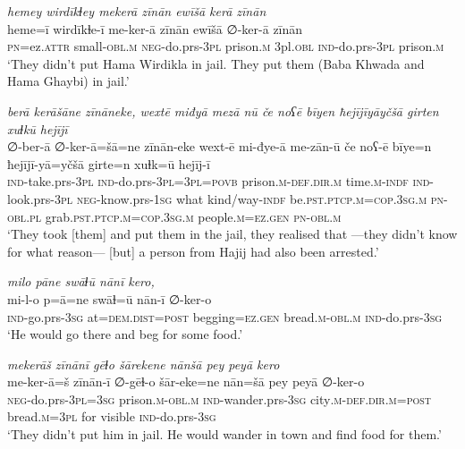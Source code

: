\ea \label{BP.138}
\textit{hemey wirdīkɫey mekerā zīnān ewīšā kerā zīnān} \\ 
\gll heme=ī wirdīkɫe-ī me-ker-ā zīnān ewīšā ∅-ker-ā zīnān \\ 
 \textsc{pn}=ez.\textsc{attr} small\textsc{-obl}\textsc{.m} \textsc{neg-}do.prs\textsc{-3pl} prison\textsc{.m} 3pl\textsc{.obl} \textsc{ind-}do.prs\textsc{-3pl} prison\textsc{.m} \\ 
\glt `They didn’t put Hama Wirdikla in jail. They put them (Baba Khwada and Hama Ghaybi) in jail.'
\z 
 
\ea \label{BP.139}
\textit{berā kerāšāne zīnāneke, wextē miđyā mezā nū če noʕē bīyen ħejījīyāyčšā girten xuɫkū hejījī} \\ 
\gll ∅-ber-ā ∅-ker-ā=šā=ne zīnān-eke wext-ē mi-đye-ā me-zān-ū če noʕ-ē bīye=n ħejījī-yā=yčšā girte=n xuɫk=ū hejīj-ī \\ 
 \textsc{ind-}take.prs\textsc{-3pl} \textsc{ind-}do.prs\textsc{-3pl}\textsc{=3pl}\textsc{=\textsc{povb}} prison\textsc{.m}\textsc{-def}\textsc{.dir}\textsc{.m} time\textsc{.m}\textsc{-indf} \textsc{ind-}look.prs\textsc{-3pl} \textsc{neg-}know.prs\textsc{-\textsc{1sg}} what kind/way\textsc{-indf} be\textsc{.pst}\textsc{.ptcp}\textsc{.m}\textsc{=cop}\textsc{.3sg}\textsc{.m} \textsc{pn}\textsc{-obl}\textsc{.pl} grab\textsc{.pst}\textsc{.ptcp}\textsc{.m}\textsc{=cop}\textsc{.3sg}\textsc{.m} people\textsc{.m}\textsc{=ez.gen} \textsc{pn}\textsc{-obl}\textsc{.m} \\ 
\glt `They took [them] and put them in the jail, they realised that —they didn’t know for what reason— [but] a person from Hajij had also been arrested.'
\z 
 
\ea \label{BP.144}
\textit{milo pāne swāɫū nānī kero,} \\ 
\gll mi-l-o p=ā=ne swāɫ=ū nān-ī ∅-ker-o \\ 
 \textsc{ind-}go.prs\textsc{-3sg} at=\textsc{dem.dist}\textsc{=\textsc{post}} begging\textsc{=ez.gen} bread\textsc{.m}\textsc{-obl}\textsc{.m} \textsc{ind-}do.prs\textsc{-3sg} \\ 
\glt `He would go there and beg for some food.'
\z 
 
\ea \label{BP.148}
\textit{mekerāš zīnānī gēɫo šārekene nānšā pey peyā kero} \\ 
\gll me-ker-ā=š zīnān-ī ∅-gēɫ-o šār-eke=ne nān=šā pey peyā ∅-ker-o \\ 
 \textsc{neg-}do.prs\textsc{-3pl}\textsc{=3sg} prison\textsc{.m}\textsc{-obl}\textsc{.m} \textsc{ind-}wander.prs\textsc{-3sg} city\textsc{.m}\textsc{-def}\textsc{.dir}\textsc{.m}\textsc{=\textsc{post}} bread\textsc{.m}\textsc{=3pl} for visible \textsc{ind-}do.prs\textsc{-3sg} \\ 
\glt `They didn’t put him in jail. He would wander in town and find food for them.'
\z 
 
